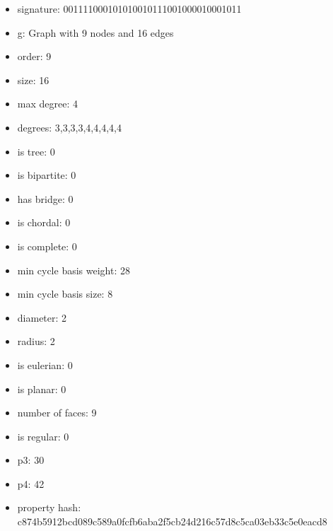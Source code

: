 \begin{figure}
\end{figure}
\begin{itemize}
\item signature: 001111000101010010111001000010001011
\item g: Graph with 9 nodes and 16 edges
\item order: 9
\item size: 16
\item max degree: 4
\item degrees: 3,3,3,3,4,4,4,4,4
\item is tree: 0
\item is bipartite: 0
\item has bridge: 0
\item is chordal: 0
\item is complete: 0
\item min cycle basis weight: 28
\item min cycle basis size: 8
\item diameter: 2
\item radius: 2
\item is eulerian: 0
\item is planar: 0
\item number of faces: 9
\item is regular: 0
\item p3: 30
\item p4: 42
\item property hash: c874b5912bcd089c589a0fcfb6aba2f5cb24d216c57d8c5ca03eb33c5e0eacd8
\end{itemize}
